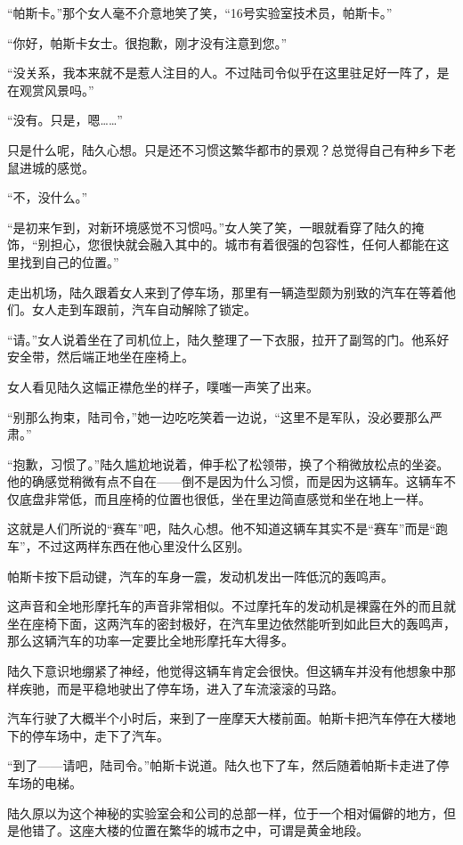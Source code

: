 “帕斯卡。”那个女人毫不介意地笑了笑，“16号实验室技术员，帕斯卡。”

“你好，帕斯卡女士。很抱歉，刚才没有注意到您。”

“没关系，我本来就不是惹人注目的人。不过陆司令似乎在这里驻足好一阵了，是在观赏风景吗。”

“没有。只是，嗯……”

只是什么呢，陆久心想。只是还不习惯这繁华都市的景观？总觉得自己有种乡下老鼠进城的感觉。

“不，没什么。”

“是初来乍到，对新环境感觉不习惯吗。”女人笑了笑，一眼就看穿了陆久的掩饰，“别担心，您很快就会融入其中的。城市有着很强的包容性，任何人都能在这里找到自己的位置。”

走出机场，陆久跟着女人来到了停车场，那里有一辆造型颇为别致的汽车在等着他们。女人走到车跟前，汽车自动解除了锁定。

“请。”女人说着坐在了司机位上，陆久整理了一下衣服，拉开了副驾的门。他系好安全带，然后端正地坐在座椅上。

女人看见陆久这幅正襟危坐的样子，噗嗤一声笑了出来。

“别那么拘束，陆司令，”她一边吃吃笑着一边说，“这里不是军队，没必要那么严肃。”

“抱歉，习惯了。”陆久尴尬地说着，伸手松了松领带，换了个稍微放松点的坐姿。他的确感觉稍微有点不自在——倒不是因为什么习惯，而是因为这辆车。这辆车不仅底盘非常低，而且座椅的位置也很低，坐在里边简直感觉和坐在地上一样。

这就是人们所说的“赛车”吧，陆久心想。他不知道这辆车其实不是“赛车”而是“跑车”，不过这两样东西在他心里没什么区别。

帕斯卡按下启动键，汽车的车身一震，发动机发出一阵低沉的轰鸣声。

这声音和全地形摩托车的声音非常相似。不过摩托车的发动机是裸露在外的而且就坐在座椅下面，这两汽车的密封极好，在汽车里边依然能听到如此巨大的轰鸣声，那么这辆汽车的功率一定要比全地形摩托车大得多。

陆久下意识地绷紧了神经，他觉得这辆车肯定会很快。但这辆车并没有他想象中那样疾驰，而是平稳地驶出了停车场，进入了车流滚滚的马路。

汽车行驶了大概半个小时后，来到了一座摩天大楼前面。帕斯卡把汽车停在大楼地下的停车场中，走下了汽车。

“到了——请吧，陆司令。”帕斯卡说道。陆久也下了车，然后随着帕斯卡走进了停车场的电梯。

陆久原以为这个神秘的实验室会和公司的总部一样，位于一个相对偏僻的地方，但是他错了。这座大楼的位置在繁华的城市之中，可谓是黄金地段。


